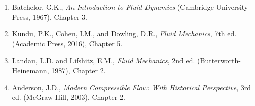 \begin{enumerate}
\item Batchelor, G.K., \textit{An Introduction to Fluid Dynamics} (Cambridge University Press, 1967), Chapter 3.
\item Kundu, P.K., Cohen, I.M., and Dowling, D.R., \textit{Fluid Mechanics}, 7th ed. (Academic Press, 2016), Chapter 5.
\item Landau, L.D. and Lifshitz, E.M., \textit{Fluid Mechanics}, 2nd ed. (Butterworth-Heinemann, 1987), Chapter 2.
\item Anderson, J.D., \textit{Modern Compressible Flow: With Historical Perspective}, 3rd ed. (McGraw-Hill, 2003), Chapter 2.
\end{enumerate}

